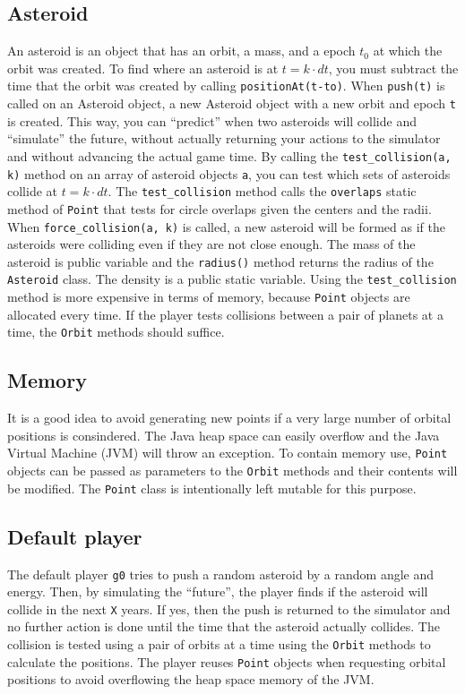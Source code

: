\begin{appendices}
\subsection{Asteroid}

An asteroid is an object that has an orbit, a mass, and a epoch $t_0$ at which the orbit was created. To find where an asteroid is at $t = k \cdot dt$, you must subtract the time that the orbit was created by calling \verb#positionAt(t-to)#. When \verb#push(t)# is called on an Asteroid object, a new Asteroid object with a new orbit and epoch \verb#t# is created. This way, you can ``predict'' when two asteroids will collide and ``simulate'' the future, without actually returning your actions to the simulator and without advancing the actual game time. By calling the \verb#test_collision(a, k)# method on an array of asteroid objects \verb#a#, you can test which sets of asteroids collide at $t = k \cdot dt$. The \verb#test_collision# method calls the \verb#overlaps# static method of \verb#Point# that tests for circle overlaps given the centers and the radii. When \verb#force_collision(a, k)# is called, a new asteroid will be formed as if the asteroids were colliding even if they are not close enough. The mass of the asteroid is public variable and the \verb#radius()# method returns the radius of the \verb#Asteroid# class. The density is a public static variable. Using the \verb#test_collision# method is more expensive in terms of memory, because \verb#Point# objects are allocated every time. If the player tests collisions between a pair of planets at a time, the \verb#Orbit# methods should suffice.

\subsection{Memory}

It is a good idea to avoid generating new points if a very large number of orbital positions is consindered. The Java heap space can easily overflow and the Java Virtual Machine (JVM) will throw an exception. To contain memory use, \verb#Point# objects can be passed as parameters to the \verb#Orbit# methods and their contents will be modified. The \verb#Point# class is intentionally left mutable for this purpose.

\subsection{Default player}

The default player \verb#g0# tries to push a random asteroid by a random angle and energy. Then, by simulating the ``future'', the player finds if the asteroid will collide in the next \verb#X# years. If yes, then the push is returned to the simulator and no further action is done until the time that the asteroid actually collides. The collision is tested using a pair of orbits at a time using the \verb#Orbit# methods to calculate the positions. The player reuses \verb#Point# objects when requesting orbital positions to avoid overflowing the heap space memory of the JVM.


\end{appendices}

